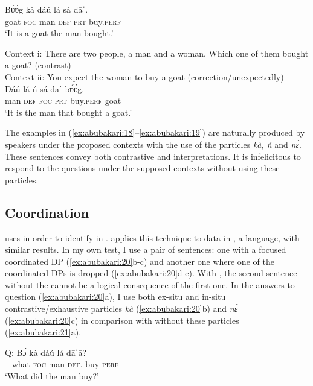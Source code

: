 \documentclass[output=paper,modfonts,nonflat,
\ChapterDOI{10.5281/zenodo.3367154}
 hidelinks
]{langsci/langscibook}
\begin{document}
\ex\label{ex:abubakari:18b}
\gll Bʋ́ʋ́g  kà  dáú  lá  sá  dāˈ. \\        goat  \textsc{foc}  man  \textsc{def}  \textsc{prt}  buy.\textsc{perf} \\
\glt ‘It is a goat the man bought.’
\z
\z

\ea\label{ex:abubakari:19} 
Context i: There are two people, a man and a woman.       Which one of them bought a goat? (contrast)\\
 
Context ii: You expect the woman to buy a goat    
	(correction/unexpectedly)\\

\ea\label{ex:abubakari:19a} 
\gll Dáú  lá  ń  sá  dāˈ    bʋ́ʋ́g.\\
man    \textsc{def}  \textsc{foc}  \textsc{prt}  buy.\textsc{perf}  goat\\
\glt ‘It is the    man   that bought a goat.’
\z
\z 

The examples in (\ref{ex:abubakari:18}--\ref{ex:abubakari:19}) are naturally produced by speakers under the proposed contexts with the use of the particles \textit{kà, ń} and \textit{nɛ́}. These sentences convey both contrastive and  interpretations. It is infelicitous to respond to the questions under the supposed contexts without using these particles.
 

\subsection{Coordination}

 
\citet{szabolcsi1981} uses  in order to identify  in . \citet{duah2015} applies this technique to data in , a  language, with similar results. In my own test, I use a pair of sentences: one with a focused coordinated DP (\ref{ex:abubakari:20}b-c) and another one where one of the coordinated DPs is dropped (\ref{ex:abubakari:20}d-e). With , the second sentence without the  cannot be a logical consequence of the first one. In the answers to question (\ref{ex:abubakari:20}a), I use both ex-situ and in-situ contrastive{\slash}exhaustive particles \textit{kà} (\ref{ex:abubakari:20}b) and \textit{nɛ́} (\ref{ex:abubakari:20}c) in comparison with  without these particles (\ref{ex:abubakari:21}a).
 

 
\ea\label{ex:abubakari:20}
\ea\label{ex:abubakari:20a}
\gll Q: Bɔ́  kà  dáú  lá  dāˈā?\\                  
  ~     what  \textsc{foc}  man  \textsc{def}.  buy-\textsc{perf}   \\
\glt ‘What did the man buy?’
\end{document}
